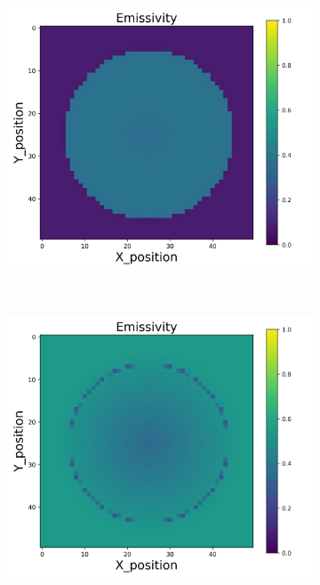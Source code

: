 {\begin{figure}[h]
\begin{minipage}{\textwidth}
\begin{subfigure}{0.27\textwidth}
        \end{subfigure}
        \begin{subfigure}{0.27\textwidth}
            \centering
            \includegraphics[width=\textwidth]{figures/raw_data/21/T3500/linear/emi_cal.jpg}
        \end{subfigure}
    \end{minipage}\\
    \begin{minipage}{\textwidth}
        \centering
        \begin{subfigure}{0.27\textwidth}
            \centering
            \includegraphics[width=\textwidth]{figures/raw_data/22/T3500/linear/emi_cal.jpg}

\end{subfigure}
\end{minipage}
\end{figure}}
